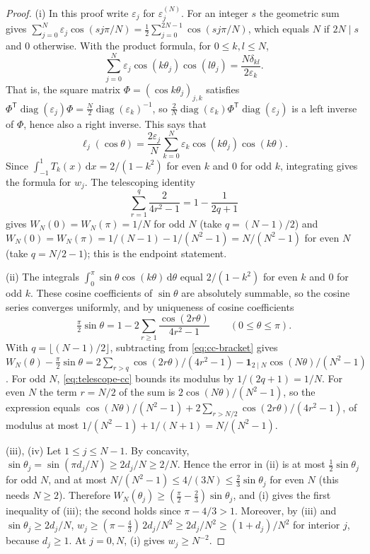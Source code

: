 \documentclass[preprint,12pt,a4paper]{elsarticle}
\theoremstyle{remark}
\newcommand{\dd}{\,\mathrm d}
\DeclareMathOperator{\diag}{diag}
\begin{document}
\begin{proof}
(i) In this proof write $\varepsilon_j$ for $\varepsilon^{(N)}_j$.
For an integer $s$ the geometric sum gives
$\sum_{j=0}^N\varepsilon_j\cos(sj\pi/N)
=\frac12\sum_{j=0}^{2N-1}\cos(sj\pi/N)$, which equals $N$ if $2N\mid s$
and $0$ otherwise. With the product formula, for $0\le k,l\le N$,
\[
 \sum_{j=0}^N\varepsilon_j\cos(k\theta_j)\cos(l\theta_j)
 =\frac{N\delta_{kl}}{2\varepsilon_k}.
\]
That is, the square matrix $\Phi=(\cos k\theta_j)_{j,k}$ satisfies
$\Phi^{\mathsf T}\diag(\varepsilon_j)\Phi=\frac N2\diag(\varepsilon_k)^{-1}$, so
$\frac2N\diag(\varepsilon_k)\Phi^{\mathsf T}\diag(\varepsilon_j)$ is a left
inverse of $\Phi$, hence also a right inverse. This says that
\[
 \ell_j(\cos\theta)=\frac{2\varepsilon_j}{N}\sum_{k=0}^N
 \varepsilon_k\cos(k\theta_j)\cos(k\theta).
\]
Since $\int_{-1}^1T_k(x)\dd x=2/(1-k^2)$ for even $k$ and $0$ for odd $k$,
integrating gives the formula for $w_j$. The telescoping identity
\begin{equation}\label{eq:telescope-cc}
 \sum_{r=1}^q\frac2{4r^2-1}=1-\frac1{2q+1}
\end{equation}
gives $W_N(0)=W_N(\pi)=1/N$ for odd $N$ (take $q=(N-1)/2$) and
$W_N(0)=W_N(\pi)=1/(N-1)-1/(N^2-1)=N/(N^2-1)$ for even $N$
(take $q=N/2-1$); this is the endpoint statement.

(ii) The integrals
$\int_0^\pi\sin\theta\cos(k\theta)\dd\theta$ equal $2/(1-k^2)$ for even $k$
and $0$ for odd $k$. These cosine coefficients of $\sin\theta$ are
absolutely summable, so the cosine series converges uniformly, and by
uniqueness of cosine coefficients
\[
 \tfrac\pi2\sin\theta=1-2\sum_{r\ge1}\frac{\cos(2r\theta)}{4r^2-1}
 \qquad(0\le\theta\le\pi).
\]
With $q=\lfloor(N-1)/2\rfloor$, subtracting from \eqref{eq:cc-bracket} gives
$W_N(\theta)-\frac\pi2\sin\theta
=2\sum_{r>q}\cos(2r\theta)/(4r^2-1)-\boldsymbol1_{2\mid N}\cos(N\theta)/(N^2-1)$.
For odd $N$, \eqref{eq:telescope-cc} bounds its modulus by $1/(2q+1)=1/N$.
For even $N$ the term $r=N/2$ of the sum is $2\cos(N\theta)/(N^2-1)$, so
the expression equals
$\cos(N\theta)/(N^2-1)+2\sum_{r>N/2}\cos(2r\theta)/(4r^2-1)$, of modulus at
most $1/(N^2-1)+1/(N+1)=N/(N^2-1)$.

(iii), (iv) Let $1\le j\le N-1$. By concavity,
$\sin\theta_j=\sin(\pi d_j/N)\ge2d_j/N\ge2/N$. Hence the error in (ii) is
at most $\frac12\sin\theta_j$ for odd $N$, and at most
$N/(N^2-1)\le4/(3N)\le\frac23\sin\theta_j$ for even $N$ (this needs
$N\ge2$). Therefore $W_N(\theta_j)\ge(\frac\pi2-\frac23)\sin\theta_j$, and
(i) gives the first inequality of (iii); the second holds since
$\pi-4/3>1$. Moreover, by (iii) and
$\sin\theta_j\ge2d_j/N$, $w_j\ge(\pi-\frac43)\,2d_j/N^2\ge2d_j/N^2
\ge(1+d_j)/N^2$ for interior $j$, because $d_j\ge1$. At $j=0,N$,
(i) gives $w_j\ge N^{-2}$.
\end{proof}
\end{document}
